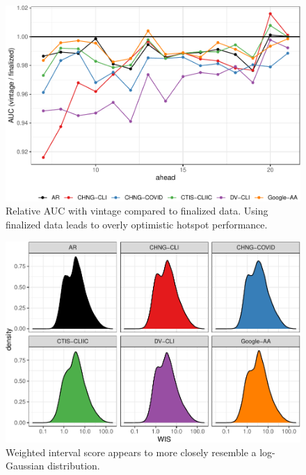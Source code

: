 \documentclass[9pt,twoside,lineno]{pnas-new}
\begin{document}
\clearpage

\begin{figure}

{\centering \includegraphics[width=\textwidth]{fig/hot-honest-v-finalized-1} 

}

\caption{Relative AUC with vintage compared to finalized data. Using finalized data leads to overly optimistic hotspot performance.}\label{fig:hot-honest-v-finalized}
\end{figure}

\clearpage

\begin{figure}

{\centering \includegraphics[width=\textwidth]{fig/wis-densities-1} 

}

\caption{Weighted interval score appears to more closely resemble a log-Gaussian distribution.}\label{fig:wis-densities}
\end{figure}
\end{document}
